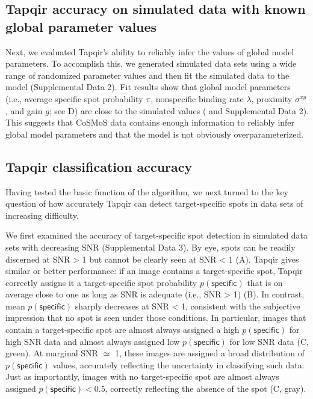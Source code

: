 \subsection{Tapqir accuracy on simulated data with known global parameter values}

Next, we evaluated Tapqir's ability to reliably infer the values of global model parameters. To  accomplish this, we generated simulated data sets using a wide range of randomized parameter values and then fit the simulated data to the model (Supplemental Data 2). Fit results show that global model parameters (i.e., average specific spot probability $\pi$, nonspecific binding rate $\lambda$, proximity $\sigma^{xy}$, and gain $g$; see D) are close to the simulated values ( and Supplemental Data 2). This suggests that CoSMoS data contains enough information to reliably infer global model parameters and that the model is not obviously overparameterized. 

\subsection{Tapqir classification accuracy}

Having tested the basic function of the algorithm, we next turned to the key question of how accurately Tapqir can detect target-specific spots in data sets of increasing difficulty.

We first examined the accuracy of target-specific spot detection in simulated data sets with decreasing SNR (Supplemental Data 3). By eye, spots can be readily discerned at SNR > 1 but cannot be clearly seen at SNR < 1 (A). Tapqir gives similar or better performance:  if an image contains a target-specific spot, Tapqir correctly assigns it a target-specific spot probability $p(\mathsf{specific})$ that is on average close to one as long as SNR is adequate (i.e., SNR > 1) (B).  In contrast, mean $p(\mathsf{specific})$ sharply decreases at SNR < 1, consistent with the subjective impression that no spot is seen under those conditions.  In particular, images that contain a target-specific spot are almost always assigned a high $p(\mathsf{specific})$ for high SNR data and almost always assigned low $p(\mathsf{specific})$ for low SNR data (C, green).  At marginal SNR $\simeq$ 1, these images are assigned a broad distribution of $p(\mathsf{specific})$ values, accurately reflecting the uncertainty in classifying such data.  Just as importantly, images with no target-specific spot are almost always assigned $p(\mathsf{specific}) < 0.5$, correctly reflecting the absence of the spot (C, gray).

